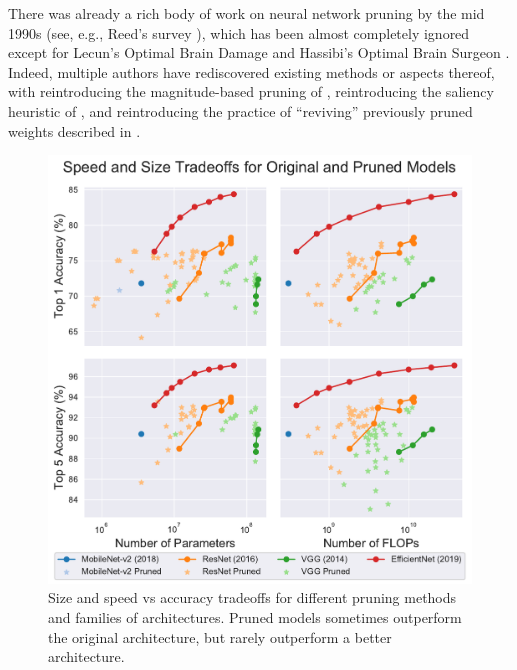 There was already a rich body of work on neural network pruning by the mid 1990s (see, e.g., Reed's survey \cite{reed_pruning_1993}), which has been almost completely ignored except for Lecun's Optimal Brain Damage \cite{optimal-brain-damage} and Hassibi's Optimal Brain Surgeon \cite{optimal-brain-surgeon}. Indeed, multiple authors have rediscovered existing methods or aspects thereof, with \citet{learning-both} reintroducing the magnitude-based pruning of \citet{janowsky_pruning_1989}, \citet{snip} reintroducing the saliency heuristic of \citet{mozer_skeletonization:_1989}, and \citet{soft-filter-pruning} reintroducing the practice of ``reviving'' previously pruned weights described in \citet{early-brain-damage}.
\begin{figure}[t]
\begin{center}
\includegraphics[width=\linewidth]{arch_vs_prune}
\vspace{-3mm}
\caption{Size and speed vs accuracy tradeoffs for different pruning methods and families of architectures. Pruned models sometimes outperform the original architecture, but rarely outperform a better architecture.}
\label{fig:arch_vs_prune}
\end{center}
\end{figure}
\vspace{3mm}

